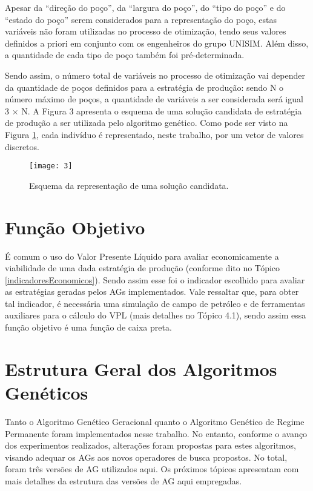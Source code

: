 Apesar da “direção do poço”, da “largura do poço”, do “tipo do poço” e do “estado do poço” serem considerados para a representação do poço, estas variáveis não foram utilizadas no processo de otimização, tendo seus valores definidos a priori em conjunto com os engenheiros do grupo UNISIM. Além disso, a quantidade de cada tipo de poço também foi pré-determinada. 

Sendo assim, o número total de variáveis no processo de otimização vai depender da quantidade de poços definidos para a estratégia de produção: sendo N o número máximo de poços, a quantidade de variáveis a ser considerada será igual 3 $\times$ N. A Figura 3 apresenta o esquema de uma solução candidata de estratégia de produção a ser utilizada pelo algoritmo genético. Como pode ser visto na Figura \ref{fig:fig3_1}, cada indivíduo é representado, neste trabalho, por um vetor de valores discretos.

\begin{figure}[htb]
  \centering
  \texttt{[image: 3]}
  \caption{Esquema da representação de uma solução candidata.}
  \label{fig:fig3_1}
\end{figure}

\section{Função Objetivo}

É comum o uso do Valor Presente Líquido para avaliar economicamente a viabilidade de uma dada estratégia de produção (conforme dito no Tópico \ref{indicadoresEconomicos}). Sendo assim esse foi o indicador escolhido para avaliar as estratégias geradas pelos AGs implementados. Vale ressaltar que, para obter tal indicador, é necessária uma simulação de campo de petróleo e de ferramentas auxiliares para o cálculo do VPL (mais detalhes no Tópico 4.1), sendo assim essa função objetivo é uma função de caixa preta. 

\section{Estrutura Geral dos Algoritmos Genéticos}

Tanto o Algoritmo Genético Geracional quanto o Algoritmo Genético de Regime Permanente foram implementados nesse trabalho. No entanto, conforme o avanço dos experimentos realizados, alterações foram propostas para estes algoritmos, visando adequar os AGs aos novos operadores de busca propostos.  No total, foram três versões de AG utilizados aqui.  Os próximos tópicos apresentam com mais detalhes da estrutura das versões de AG aqui empregadas.

